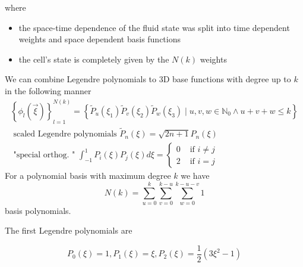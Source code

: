 where
\begin{itemize}
    \item the space-time dependence of the fluid state was split into time dependent weights and space dependent basis functions
    \item the cell's state is completely given by the $N(k)$ weights
\end{itemize}

We can combine Legendre polynomials to 3D base functions with degree up to $k$ in the following manner
\begin{equation}
    \begin{gathered}
        \left\{\phi_l(\vec{\xi})\right\}_{l=1}^{N(k)}=\left\{\tilde{P}_u\left(\xi_1\right) \tilde{P}_v\left(\xi_2\right) \tilde{P}_w\left(\xi_3\right) \mid u, v, w \in \mathbb{N}_0 \wedge u+v+w \leq k\right\} \\
        \text { scaled Legendre polynomials } \tilde{P}_n(\xi)=\sqrt{2 n+1} P_n(\xi) \\
        \text { "special orthog. " } \int_{-1}^1 P_i(\xi) P_j(\xi) d \xi= \begin{cases}0 & \text { if } i \neq j \\ 2 & \text { if } i=j\end{cases}
    \end{gathered}
\end{equation}
For a polynomial basis with maximum degree $k$ we have
\begin{equation}
    N(k)=\sum_{u=0}^k \sum_{v=0}^{k-u} \sum_{w=0}^{k-u-v} 1
\end{equation}
basis polynomials.

The first Legendre polynomials are

\begin{equation}
    P_0(\xi)=1, P_1(\xi)=\xi, P_2(\xi) = \frac{1}{2}\left(3 \xi^2-1\right)
\end{equation}


